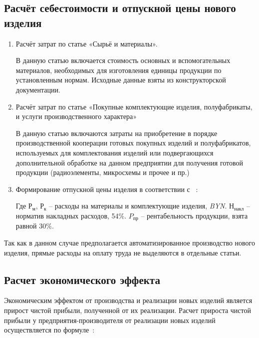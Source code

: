 \subsection{Расчёт себестоимости и отпускной цены нового изделия}

\begin{enumerate}
\item Расчёт затрат по статье «Сырьё и материалы».

  В данную статью включается стоимость основных и вспомогательных
  материалов, необходимых для изготовления единицы продукции по
  установленным нормам. Исходные данные взяты из конструкторской
  документации.
  
  

\item Расчёт затрат по статье «Покупные комплектующие изделия,
  полуфабрикаты, и услуги производственного характера»

  В данную статью включаются затраты на приобретение в порядке
  производственной кооперации готовых покупных изделий и полуфабрикатов,
  используемых для комплектования изделий или подвергающихся
  дополнительной обработке на данном предприятии для получения готовой
  продукции (радиоэлементы, микросхемы и прочее и пр.)

  

\item Формирование отпускной цены изделия в соответствии с ~\cite{bsuir-project-economics}:

  

  Где $Р_м$, $Р_к$ – расходы на материалы и комплектующие изделия, \textit{BYN}.
  $Н_{накл}$ – норматив накладных расходов, 54\%.
  $P_{пр}$ – рентабельность продукции, взята равной 30\%.
\end{enumerate}

Так как в данном случае предполагается автоматизированное производство
нового изделия, прямые расходы на оплату труда не выделяются в
отдельные статьи.

\subsection{Расчет экономического эффекта}

Экономическим эффектом от производства и реализации новых изделий
является прирост чистой прибыли, полученной от их реализации.  Расчет
прироста чистой прибыли у предприятия-производителя от реализации
новых изделий осуществляется по
формуле~\cite{bsuir-project-economics}:

